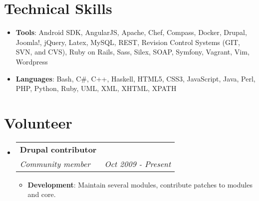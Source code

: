 \documentclass[letterpaper,11pt]{article}
\makeatletter
\newcommand{\resumeItem}[2]{
  \item\small{
    \textbf{#1}{: #2 \vspace{-2pt}}
  }
}
\newcommand{\resumeSubheading}[4]{
  \vspace{-1pt}\item
    \begin{tabular*}{0.97\textwidth}{l@{\extracolsep{\fill}}r}
      \textbf{#1} & #2 \\
      \textit{\small#3} & \textit{\small #4} \\
    \end{tabular*}\vspace{-5pt}
}
\newcommand{\resumeSubItem}[2]{\resumeItem{#1}{#2}\vspace{-4pt}}
\newcommand{\resumeSubHeadingListStart}{\begin{itemize}[leftmargin=*]}
\newcommand{\resumeSubHeadingListEnd}{\end{itemize}}
\newcommand{\resumeItemListStart}{\begin{itemize}}
\newcommand{\resumeItemListEnd}{\end{itemize}\vspace{-5pt}}
\makeatother
\begin{document}
\section{Technical Skills}

\resumeSubHeadingListStart
  \resumeSubItem{Tools}{Android SDK, AngularJS, Apache, Chef, Compass, Docker, Drupal, Joomla!, jQuery, Latex, MySQL, REST, Revision Control Systems (GIT, SVN, and CVS), Ruby on Rails, Sass, Silex, SOAP, Symfony, Vagrant, Vim, Wordpress}
  \resumeSubItem{Languages}{Bash, C\#, C++, Haskell, HTML5, CSS3, JavaScript, Java, Perl, PHP, Python, Ruby, UML, XML, XHTML, XPATH}
\resumeSubHeadingListEnd

\section{Volunteer}

\resumeSubHeadingListStart

  \resumeSubheading
    {Drupal contributor}{}
    {Community member}{Oct 2009 - Present}
    \resumeItemListStart
      \resumeItem{Development}{Maintain several modules, contribute patches to modules and core.}
    \resumeItemListEnd

\resumeSubHeadingListEnd

%


\end{document}
